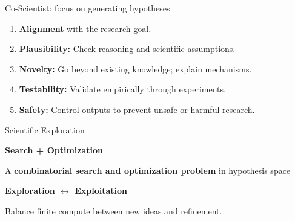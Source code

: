 \begin{frame}[t,label=md-9]{Co-Scientist: focus on generating hypotheses}
\small

\smallskip
\begin{enumerate}
\setlength{\itemsep}{0.65em}
    \item \textbf{Alignment} with the research goal.
    \item \textbf{Plausibility:} Check reasoning and scientific assumptions.
    \item \textbf{Novelty:} Go beyond existing knowledge; explain mechanisms.
    \item \textbf{Testability:} Validate empirically through experiments.
    \item \textbf{Safety:} Control outputs to prevent unsafe or harmful research.
\end{enumerate}
\end{frame}

\begin{frame}[c,label=md-10]{Scientific Exploration}
\centering
{\Large\bfseries{} Search + Optimization\par}
\smallskip
{\small A \textbf{combinatorial search and optimization problem}
in hypothesis space\par}
\vspace{0.7cm}

{\Large\bfseries{}
Exploration $\longleftrightarrow$ Exploitation\par}
\medskip
{\small Balance finite compute between new ideas and refinement.\par}
\end{frame}

